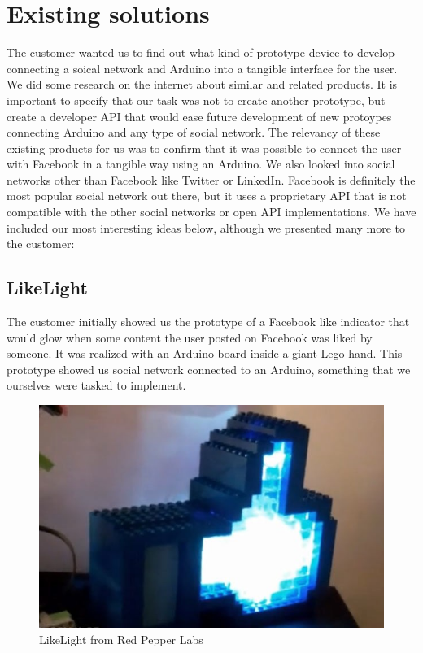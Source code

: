 \section{Existing solutions}
The customer wanted us to find out what kind of prototype device to develop connecting a soical network and Arduino
into a tangible interface for the user. We did some research on the internet about similar and related products.  It is 
important to specify that our task was not to create another prototype, but create a  developer API that would ease 
future development of new protoypes connecting Arduino and any type of social network. The relevancy of these 
existing products for us was to confirm that it was possible to connect the user with Facebook in a tangible way using
 an Arduino. We also looked into social networks other than Facebook like Twitter or LinkedIn. Facebook is definitely the 
most popular social network out there, but it uses a proprietary API that is not compatible with the other social 
networks or open API implementations. We have included our most interesting ideas below, although we presented
many more to the customer:

\subsection{LikeLight}
The customer initially showed us the prototype of a Facebook like indicator that would glow when some content the
 user posted on Facebook was liked by someone. It was realized with an Arduino board inside a giant Lego hand. 
This prototype showed us social network connected to an Arduino, something that we ourselves were tasked to 
implement.

\begin{figure}[h!]
\centering \includegraphics[scale=0.85]{img/prestudies-likehand} \caption{LikeLight from Red Pepper Labs}

\label{fig:prestudies-likehand}
\end{figure}

